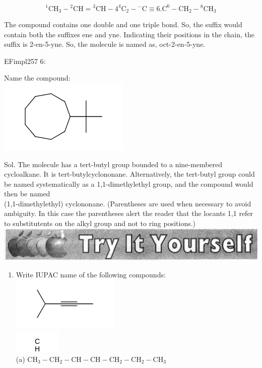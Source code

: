 \documentclass[10pt]{article}
\begin{document}
$$
{ }^{1} \mathrm{CH}_{3}-{ }^{2} \mathrm{CH}={ }^{3} \mathrm{CH}-4^{4} \mathrm{C}_{2}-{ }^{-} \mathrm{C} \equiv 6 . \mathrm{C}^{6}-\mathrm{CH}_{2}-{ }^{8} \mathrm{CH}_{3}
$$

The compound contains one double and one triple bond. So, the suffix would contain both the suffixes ene and yne. Indicating their positions in the chain, the suffix is 2-en-5-yne. So, the molecule is named as, oct-2-en-5-yne.

EFimpl257 6:

Name the compound:\\
\includegraphics{smile-4cdb1b6e72f08108ae82af08aeca6c5e88d4f098}

Sol. The molecule has a tert-butyl group bounded to a nine-membered cycloalkane. It is tert-butylcyclononane. Alternatively, the tert-butyl group could be named systematically as a 1,1-dimethylethyl group, and the compound would then be named\\
(1,1-dimethylethyl) cyclononane. (Parentheses are used when necessary to avoid ambiguity. In this case the parentheses alert the reader that the locants 1,1 refer to substitutents on the alkyl group and not to ring positions.)\\
\includegraphics[max width=\textwidth, center]{2025_01_28_8470952b98110cec3aabg-037(3)}

\begin{enumerate}
  \item Write IUPAC name of the following compounds:\\
\includegraphics{smile-32c372cfb5c1f2a33a987c1ca57a8382d27d903b}\\
\includegraphics{smile-923bf447824978088356374bbc6dc9eea8408297}\\
(a) $\mathrm{CH}_{3}-\mathrm{CH}_{2}-\mathrm{CH}-\mathrm{CH}-\mathrm{CH}_{2}-\mathrm{CH}_{2}-\mathrm{CH}_{3}$
\end{enumerate}
\end{document}
